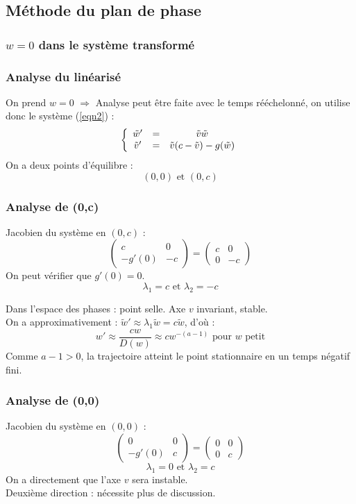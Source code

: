 \documentclass[handout]{beamer}
\begin{document}
\subsection{Méthode du plan de phase}
\subsubsection{$w=0$ dans le système transformé}

\begin{frame}
	\frametitle{Analyse du linéarisé}
On prend $w=0$ $\Rightarrow$ Analyse peut être faite avec le temps rééchelonné, on utilise donc le système (\ref{eqn2}) : 
\[\left\{ \begin{array}{c c c}
	\tilde{w}' &=& \tilde{v}\tilde{w} \\
	\tilde{v}' &=& \tilde{v}(c-\tilde{v})-g(\tilde{w})
\end{array} \right.\]
On a deux points d'équilibre : \[(0,0) \text{ et } (0,c)\]
\end{frame}

\begin{frame}
	\frametitle{Analyse de (0,c)}
Jacobien du système en $(0,c)$ : \[\begin{pmatrix} c & 0 \\ -g'(0) & -c \end{pmatrix} = \begin{pmatrix} c & 0 \\ 0 & -c \end{pmatrix}\]
On peut vérifier que $g'(0)=0$.\\
\[\lambda_1=c \text{ et } \lambda_2=-c\]

Dans l'espace des phases : point selle. Axe $v$ invariant, stable. \\
On a approximativement : $\tilde{w}'\approx \lambda_1 \tilde{w} = c\tilde{w}$, d'où : 
\[w'\approx \frac{cw}{D(w)} \approx cw^{-(a-1)} \text{ pour } w \text{ petit}\]
Comme $a-1>0$, la trajectoire atteint le point stationnaire en un temps négatif fini.
\end{frame}

\begin{frame}
	\frametitle{Analyse de (0,0)}
Jacobien du système en $(0,0)$ : \[\begin{pmatrix} 0 & 0 \\ -g'(0) & c \end{pmatrix} = \begin{pmatrix} 0 & 0 \\ 0 & c \end{pmatrix}\]
\[\lambda_1=0 \text{ et } \lambda_2=c\]
On a directement que l'axe $v$ sera instable.\\
Deuxième direction : nécessite plus de discussion.
\end{frame}
\end{document}
